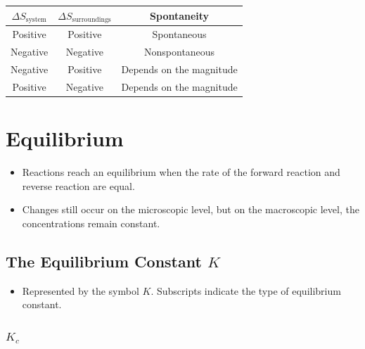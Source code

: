 \documentclass{article}
\begin{document}
\begin{center}
    \begin{tabular}{|c|c|c|}
        \hline $\Delta S_\text{system}$ & $\Delta S_\text{surroundings}$ & Spontaneity \\
        \hline Positive & Positive & Spontaneous \\
        \hline Negative & Negative & Nonspontaneous \\
        \hline Negative & Positive & Depends on the magnitude \\
        \hline Positive & Negative & Depends on the magnitude \\
        \hline
    \end{tabular}
\end{center}


\section{Equilibrium}

\begin{itemize}
    \item Reactions reach an equilibrium when the rate of the forward reaction and reverse reaction are equal.
    \item Changes still occur on the microscopic level, but on the macroscopic level, the concentrations remain constant.
\end{itemize}

\subsection{The Equilibrium Constant $K$}

\begin{itemize}
    \item Represented by the symbol $K$. Subscripts indicate the type of equilibrium constant. 
\end{itemize}

\subsubsection{$K_c$}
\end{document}
